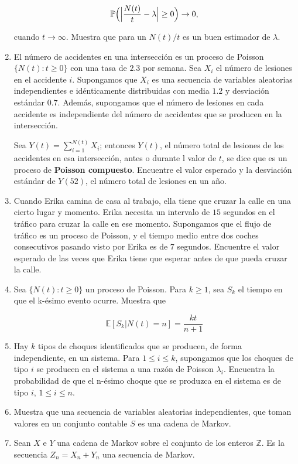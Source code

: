 \documentclass[a4paper,11pt]{report}
\newcommand{\PR}{\mathbb{P}}
\begin{document}
\begin{enumerate}
\[
\PR\Bigl(\Bigl\vert \frac{N(t)}{t} - \lambda \Bigr \vert \geq 0 \Bigr) \rightarrow 0,
\]

cuando $t \rightarrow \infty$. Muestra que para un $N(t)/t$ es un buen estimador de $\lambda$. 

\item El n\'umero de accidentes en una intersecci\'on es un proceso de Poisson $ \{N (t): t \geq  0\}$ con una tasa de $2.3$ por semana. Sea $X_i$  el n\'umero de lesiones en el  accidente $i$. Supongamos que ${X_i}$ es una \mbox{secuencia} de variables aleatorias independientes e id\'enticamente distribuidas con media $1.2$ y  \mbox{desviaci\'on} est\'andar  $0.7$. Adem\'as, supongamos que el n\'umero de lesiones en cada accidente es \mbox{independiente} del n\'umero de accidentes que se producen en la intersecci\'on.

Sea $Y(t) = \displaystyle{\sum_{i =1}^{N(t)}X_i}$; entonces $Y (t)$, el n\'umero total de lesiones de los accidentes en esa intersecci\'on, antes o durante  l valor de $t$, se dice que es un proceso de \textbf{Poisson compuesto}. Encuentre el valor esperado y la desviaci\'on est\'andar de $Y(52)$, el n\'umero total de lesiones en un a\~no.

\item Cuando Erika  camina de casa al trabajo, ella tiene que cruzar la calle en una cierto lugar y  \mbox{momento}. Erika necesita un intervalo  de $15$ segundos en el tr\'afico para cruzar la calle en ese momento. 
\mbox{Supongamos} que el flujo de tr\'afico es un proceso de Poisson, y el tiempo medio entre dos coches consecutivos \mbox{pasando} visto por  Erika es de $7$ segundos. Encuentre el valor esperado de las veces que Erika tiene que esperar antes de que pueda cruzar la calle.

\item Sea $\{N(t): t \geq 0  \}$ un proceso de Poisson. Para $k \geq 1$, sea $S_k$ el tiempo en que el k-\'esimo evento ocurre. Muestra que

\[
\mathbb{E}[S_k | N(t) = n] = \frac{kt}{ n + 1}
\]

\item Hay $k$ tipos de choques  identificados que se producen, de forma independiente, en un  sistema. Para $1 \leq i \leq  k$, supongamos que los choques de tipo $i$  se producen en el sistema a una raz\'on   de Poisson $\lambda_i$. Encuentra la probabilidad de que el n-\'esimo choque que se produzca en el   sistema es de tipo $i$, $1 \leq  i \leq  n$.

\item Muestra que una secuencia de variables aleatorias independientes, que toman valores en un conjunto contable $S$ es una cadena de Markov.
\item Sean $X$ e $Y$ una cadena de Markov sobre el conjunto de los enteros $\mathbb{Z}$. Es la secuencia $Z_n = X_n + Y_n$ una secuencia de Markov.


\end{enumerate}
\end{document}
